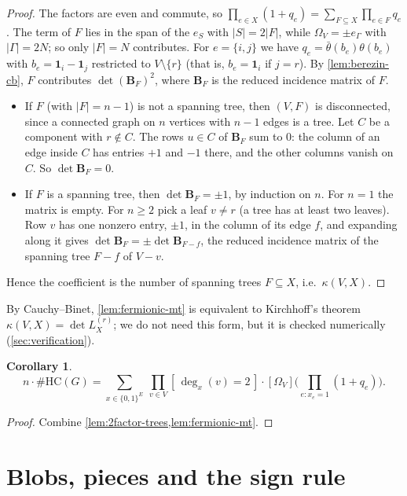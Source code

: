 \documentclass[11pt]{amsart}
\theoremstyle{plain}
\newtheorem{corollary}[theorem]{Corollary}
\theoremstyle{definition}
\theoremstyle{remark}
\numberwithin{equation}{section}
\newcommand{\HC}{\#\mathrm{HC}}
\newcommand{\topc}[2]{[#1]\bigl(#2\bigr)}
\newcommand{\Ind}[1]{[\,#1\,]}
\begin{document}
\begin{proof}
The factors are even and commute, so $\prod_{e\in X}(1+q_e)=\sum_{F\subseteq X}\prod_{e\in F}q_e$.
The term of $F$ lies in the span of the $e_S$ with $|S|=2|F|$, while $\Omega_V=\pm e_\Gamma$ with
$|\Gamma|=2N$; so only $|F|=N$ contributes. For $e=\{i,j\}$ we have
$q_e=\bar\theta(b_e)\theta(b_e)$ with $b_e=\mathbf 1_i-\mathbf 1_j$ restricted to
$V\setminus\{r\}$ (that is, $b_e=\mathbf 1_i$ if $j=r$). By \cref{lem:berezin-cb}, $F$ contributes
$\det(\mathbf B_F)^2$, where $\mathbf B_F$ is the reduced incidence matrix of $F$.
\begin{itemize}
\item If $F$ (with $|F|=n-1$) is not a spanning tree, then $(V,F)$ is disconnected, since a
connected graph on $n$ vertices with $n-1$ edges is a tree. Let $C$ be a component with $r\notin
C$. The rows $u\in C$ of $\mathbf B_F$ sum to $0$: the column of an edge inside $C$ has entries
$+1$ and $-1$ there, and the other columns vanish on $C$. So $\det\mathbf B_F=0$.
\item If $F$ is a spanning tree, then $\det\mathbf B_F=\pm1$, by induction on $n$. For $n=1$ the
matrix is empty. For $n\ge2$ pick a leaf $v\ne r$ (a tree has at least two leaves). Row $v$ has
one nonzero entry, $\pm1$, in the column of its edge $f$, and expanding along it gives
$\det\mathbf B_F=\pm\det\mathbf B_{F-f}$, the reduced incidence matrix of the spanning tree
$F-f$ of $V-v$.
\end{itemize}
Hence the coefficient is the number of spanning trees $F\subseteq X$, i.e.\ $\kappa(V,X)$.
\end{proof}

By Cauchy--Binet, \cref{lem:fermionic-mt} is equivalent to Kirchhoff's theorem
$\kappa(V,X)=\det L_X^{(r)}$; we do not need this form, but it is checked numerically
(\cref{sec:verification}).

\begin{corollary}\label{cor:hc-berezin}
\[
  n\cdot\HC(G)=\sum_{x\in\{0,1\}^E}\ \prod_{v\in V}\Ind{\deg_x(v)=2}\cdot
  \topc{\Omega_V}{\prod_{e\colon x_e=1}(1+q_e)} .
\]
\end{corollary}

\begin{proof}
Combine \cref{lem:2factor-trees,lem:fermionic-mt}.
\end{proof}

\section{Blobs, pieces and the sign rule}\label{sec:blobs}
\end{document}
